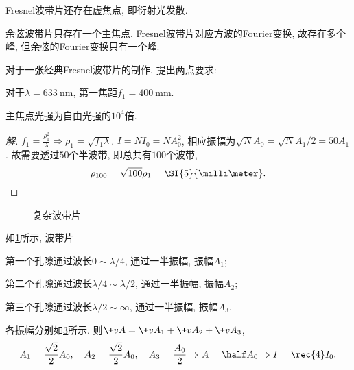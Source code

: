 \documentclass{ctexart}
\begin{document}
\begin{remark}
    Fresnel波带片还存在虚焦点, 即衍射光发散.
\end{remark}
\begin{remark}
    余弦波带片只存在一个主焦点. Fresnel波带片对应方波的Fourier变换, 故存在多个峰, 但余弦的Fourier变换只有一个峰.
\end{remark}
\begin{sample}
    \begin{ex}
        对于一张经典Fresnel波带片的制作, 提出两点要求:
        \begin{cenum}
            \item 对于$\lambda = \SI{633}{\nano\meter}$, 第一焦距$f_1 = \SI{400}{\milli\meter}$.
            \item 主焦点光强为自由光强的$10^4$倍.
        \end{cenum}
    \end{ex}
    \begin{proof}[解]
        $f_1 = \displaystyle \frac{\rho_1^2}{\lambda} \Rightarrow \rho_1 = \sqrt{f_1\lambda}$. $I = NI_0 = NA_0^2$, 相应振幅为$\sqrt{N}A_0 = \sqrt{N}A_1/2 = 50A_1$. 故需要透过$50$个半波带, 即总共有$100$个波带,
        \[ \rho_{100} = \sqrt{100}\rho_1 = \SI{5}{\milli\meter}. \qedhere \]
    \end{proof}
\end{sample}
\begin{figure}[ht]
    \centering
    \begin{subfigure}[b]{5.5cm}
        \centering
        \caption{}
        \label{fig:复杂波带片1}
    \end{subfigure}
    \let\saveinfty\infty%
    \def\infty{\max}%
    \begin{subfigure}[b]{6.5cm}
        \centering
        \caption{}
        \label{fig:复杂波带片1向量图}
    \end{subfigure}
    \let\infty\saveinfty%
    \caption{复杂波带片}
\end{figure}
\begin{sample}
    \begin{ex}
        如\cref{fig:复杂波带片1}所示, 波带片
        \begin{cenum}
            \item 第一个孔隙通过波长$0\sim \lambda/4$, 通过一半振幅, 振幅$A_1$;
            \item 第二个孔隙通过波长$\lambda/4\sim \lambda/2$, 通过一半振幅, 振幅$A_2$;
            \item 第三个孔隙通过波长$\lambda/2\sim \infty$, 通过一半振幅, 振幅$A_3$.
        \end{cenum}
        各振幅分别如\cref{fig:复杂波带片1向量图}所示. 则$\+vA = \+vA_1 + \+vA_2 + \+vA_3$,
        \[ A_1 = \frac{\sqrt{2}}{2} A_0,\quad A_2 = \frac{\sqrt{2}}{2}A_0,\quad A_3 = \frac{A_0}{2}\Rightarrow A = \half A_0\Rightarrow I = \rec{4}I_0. \]
    \end{ex}
\end{sample}
\end{document}

